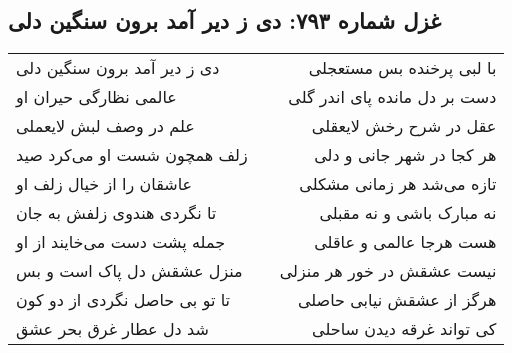 \begin{center}
\section*{غزل شماره ۷۹۳: دی ز دیر آمد برون سنگین دلی}
\label{sec:793}
\begin{longtable}{l p{0.5cm} r}
دی ز دیر آمد برون سنگین دلی
&&
با لبی پرخنده بس مستعجلی
\\
عالمی نظارگی حیران او
&&
دست بر دل مانده پای اندر گلی
\\
علم در وصف لبش لایعملی
&&
عقل در شرح رخش لایعقلی
\\
زلف همچون شست او می‌کرد صید
&&
هر کجا در شهر جانی و دلی
\\
عاشقان را از خیال زلف او
&&
تازه می‌شد هر زمانی مشکلی
\\
تا نگردی هندوی زلفش به جان
&&
نه مبارک باشی و نه مقبلی
\\
جمله پشت دست می‌خایند از او
&&
هست هرجا عالمی و عاقلی
\\
منزل عشقش دل پاک است و بس
&&
نیست عشقش در خور هر منزلی
\\
تا تو بی حاصل نگردی از دو کون
&&
هرگز از عشقش نیابی حاصلی
\\
شد دل عطار غرق بحر عشق
&&
کی تواند غرقه دیدن ساحلی
\\
\end{longtable}
\end{center}
